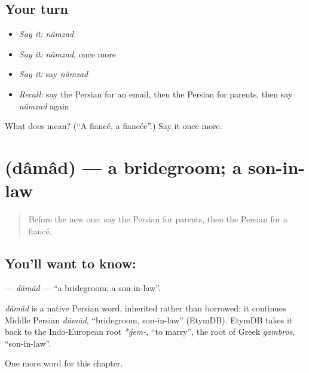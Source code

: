 \subsection*{Your turn}
\begin{itemize}
\raggedright
  \item \emph{Say it:} \emph{nâmzad}
  \item \emph{Say it:} \emph{nâmzad}, once more
  \item \emph{Say it:} say \emph{nâmzad}
  \item \emph{Recall:} say the Persian for an email, then the Persian for parents, then say \emph{nâmzad} again
\end{itemize}

\begin{tcolorbox}[breakable,colback=teal!4,colframe=teal!35!black,title={Before you move on}]
What does  mean? (\textquotedblleft{}A fiancé, a fiancée\textquotedblright{}.) Say it once more.
\end{tcolorbox}
\section[\texorpdfstring{\fa{داماد} (dâmâd)}{داماد (dâmâd)}]{ (dâmâd) — a bridegroom; a son-in-law}

\label{lesson:FA-C277-damad}



\begin{quote}
Before the new one: say the Persian for parents, then the Persian for a fiancé.
\end{quote}

\subsection*{You'll want to know: }
\textbf{} — \emph{dâmâd} — \textquotedblleft{}a bridegroom; a son-in-law\textquotedblright{}.

\begin{cousinweb}
\emph{dâmâd} is a native Persian word, inherited rather than borrowed: it continues Middle Persian \emph{dāmād}, \textquotedblleft{}bridegroom, son-in-law\textquotedblright{} (EtymDB). EtymDB takes it back to the Indo-European root \emph{*ǵem-}, \textquotedblleft{}to marry\textquotedblright{}, the root of Greek \emph{gambros}, \textquotedblleft{}son-in-law\textquotedblright{}.
\end{cousinweb}

\begin{grammarlens}[title={What you've built}]
One more word for this chapter.
\end{grammarlens}

